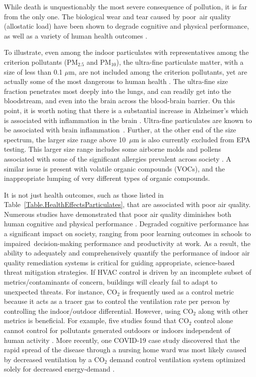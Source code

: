 While death is unquestionably the most severe consequence of pollution, it is far from the only one. The biological wear and tear caused by poor air quality (allostatic load) have been shown to degrade cognitive and physical performance, as well as a variety of human health outcomes \cite{Krebs2021AirPC, Gao2021ShorttermAP, Carneiro2021TheEO, Ni2021AssociationsOP, Shehab2019EffectsOS}.


To illustrate, even among the indoor particulates with representatives among the criterion pollutants (PM$_{2.5}$ and PM$_{10}$), the ultra-fine particulate matter, with a size of less than 0.1 $\mu$m,  are not included among the criterion pollutants, yet  are actually some of the most dangerous to human health \cite{Ehsanifar:2021, Ehsani:2022, Ehsanifar:2022b, Zhang:2019}. The ultra-fine size fraction penetrates most deeply into the lungs, and can readily get into the bloodstream, and even into the brain across the blood-brain barrier. On this point, it is worth noting that there is a substantial increase in Alzheimer's which is associated with inflammation in the brain \cite{Urrutia:2021}. Ultra-fine particulates are known to be associated with brain \hbox{inflammation \cite{Rhew:2021}}. Further, at the other end of the size spectrum, the larger size range above \hbox{10 $\mu$m} is also currently excluded from EPA testing. This larger size range includes some airborne molds and pollens associated with some of the significant allergies prevalent across society \cite{DAmato:2020}. A similar issue is present with volatile organic compounds (VOCs), and the inappropriate lumping of very different types of organic compounds.

It is not just health outcomes, such as those listed in Table~\ref{Table.HealthEffectsParticulates}, that are associated with poor air quality. Numerous studies have demonstrated that poor air quality diminishes both human cognitive and physical performance \cite{Krebs2021AirPC, Gao2021ShorttermAP, Carneiro2021TheEO, Ni2021AssociationsOP, Shehab2019EffectsOS}. Degraded cognitive performance has a significant impact on society, ranging from poor learning outcomes in schools to impaired decision-making performance and productivity at work. As a result, the ability to adequately and comprehensively quantify the performance of indoor air quality remediation systems is critical for guiding appropriate, science-based threat mitigation strategies. If HVAC control is driven by an incomplete subset of metrics/contaminants of concern, buildings will clearly fail to adapt to unexpected threats. For instance, CO$_2$ is frequently used as a control metric because it acts as a tracer gas to control the ventilation rate per person by controlling the indoor/outdoor differential. However, using CO$_2$ along with other metrics is beneficial. For example, five studies found that CO$_2$ control alone cannot control for pollutants generated outdoors or indoors independent of human activity \cite{zaatari_impact_2016}. More recently, one COVID-19 case study discovered that the rapid spread of the disease through a nursing home ward was most likely caused by decreased ventilation by a CO$_2$ demand control ventilation system optimized solely for decreased energy-demand \cite{lamping_air_nodate}.




